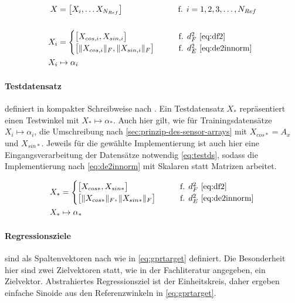 \begin{align}\label{eq:trainds}
	X   &= \big[ X_i, \ldots X_{N_{Ref}} \big] \qquad\qquad\qquad\quad\!  \text{f. } i = 1,2,3,\ldots,N_{Ref} \nonumber \\
	\\
	X_i &= 
		\begin{cases}
			\big[ X_{cos,i}, X_{sin,i} \big]             &\qquad \text{f. } d_F^2 \text{ \eqref{eq:df2}} \\
			\big[ \|X_{cos,i}\|_F, \|X_{sin,i}\|_F \big] &\qquad \text{f. } d_E^2 \text{ \eqref{eq:de2innorm}}
		\end{cases} \nonumber \\
	X_i & \mapsto \alpha_i \nonumber
\end{align}


\paragraph*{Testdatensatz} definiert in kompakter Schreibweise nach \cite{Rasmussen2006}. Ein Testdatensatz $X_*$ repräsentiert einen Testwinkel mit $X_* \mapsto \alpha_*$. Auch hier gilt, wie für Trainingsdatensätze $X_i \mapsto \alpha_i$, die Umschreibung nach \autoref{sec:prinzip-des-sensor-arrays} mit $X_{cos*} = A_x$ und $X_{sin*}$. Jeweils für die gewählte Implementierung ist auch hier eine Eingangsverarbeitung der Datensätze notwendig \autoref{eq:testds}, sodass die Implementierung nach \autoref{eq:de2innorm} mit Skalaren statt Matrizen arbeitet. 


\begin{align}\label{eq:testds}
	X_* &= 
	\begin{cases}
		\big[ X_{cos*}, X_{sin*} \big]             &\qquad \text{f. } d_F^2 \text{ \eqref{eq:df2}} \\
		\big[ \|X_{cos*}\|_F, \|X_{sin*}\|_F \big] &\qquad \text{f. } d_E^2 \text{ \eqref{eq:de2innorm}}
	\end{cases} \\
	X_* & \mapsto \alpha_* \nonumber
\end{align}


\clearpage


\paragraph*{Regressionsziele} sind als Spaltenvektoren nach \cite{Rasmussen2006} wie in \autoref{eq:gprtarget} definiert. Die Besonderheit hier sind zwei Zielvektoren statt, wie in der Fachliteratur \cite{Rasmussen2006} angegeben, ein Zielvektor. Abstrahiertes Regressionsziel ist der Einheitskreis, daher ergeben einfache Sinoide aus den Referenzwinkeln in \autoref{eq:gprtarget}.


